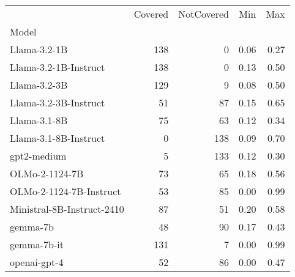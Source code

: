 \begin{tabular}{lrrrr}
\toprule
 & Covered & NotCovered & Min & Max \\
Model &  &  &  &  \\
\midrule
Llama-3.2-1B & 138 & 0 & 0.06 & 0.27 \\
Llama-3.2-1B-Instruct & 138 & 0 & 0.13 & 0.50 \\
Llama-3.2-3B & 129 & 9 & 0.08 & 0.50 \\
Llama-3.2-3B-Instruct & 51 & 87 & 0.15 & 0.65 \\
Llama-3.1-8B & 75 & 63 & 0.12 & 0.34 \\
Llama-3.1-8B-Instruct & 0 & 138 & 0.09 & 0.70 \\
gpt2-medium & 5 & 133 & 0.12 & 0.30 \\
OLMo-2-1124-7B & 73 & 65 & 0.18 & 0.56 \\
OLMo-2-1124-7B-Instruct & 53 & 85 & 0.00 & 0.99 \\
Ministral-8B-Instruct-2410 & 87 & 51 & 0.20 & 0.58 \\
gemma-7b & 48 & 90 & 0.17 & 0.43 \\
gemma-7b-it & 131 & 7 & 0.00 & 0.99 \\
openai-gpt-4 & 52 & 86 & 0.00 & 0.47 \\
\bottomrule
\end{tabular}

